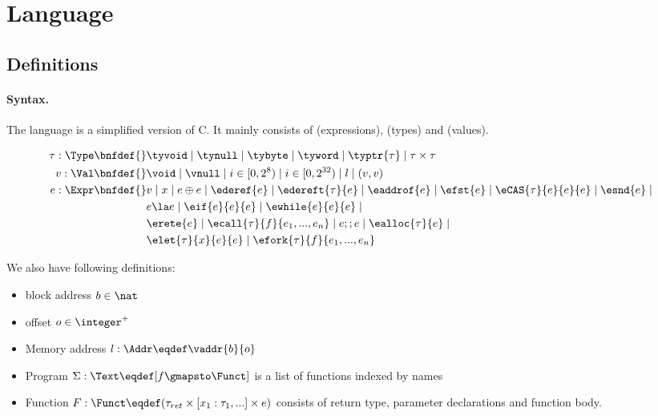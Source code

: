 \section{Language}
\label{sec:language}

\subsection{Definitions}

\paragraph{Syntax.}\label{p:type}

The language is a simplified version of C. It mainly consists of
\Expr{} (expressions), \Type{} (types) and \Val{} (values).

\begin{align*}
    \tau : \Type \bnfdef{}&
        \tyvoid \mid
        \tynull \mid
        \tybyte \mid
        \tyword \mid
        \typtr{\tau} \mid
        \tau \times \tau
\\
    v : \Val \bnfdef{}&
        \void \mid
        \vnull \mid
        i \in [0, 2^8) \mid
        i \in [0, 2^{32}) \mid
        l \mid
        (v, v)
\\
    e : \Expr \bnfdef{}&
       v \mid
       x \mid
       e \oplus e \mid
       \ederef{e} \mid
       \edereft{\tau}{e} \mid
       \eaddrof{e} \mid
       \efst{e} \mid
       \eCAS{\tau}{e}{e}{e} \mid
       \esnd{e} \mid
       \\&
       e \la e \mid
       \eif{e}{e}{e} \mid
       \ewhile{e}{e}{e} \mid
       \\&
       \erete{e} \mid
       \ecall{\tau}{f}{e_1, ..., e_n} \mid
       e ;; e \mid
       \ealloc{\tau}{e} \mid
       \\&
       \elet{\tau}{x}{e}{e} \mid
       \efork{\tau}{f}{e_1, ..., e_n}
\\
\end{align*}

We also have following definitions:

\begin{itemize}
  \item block address $b \in \nat$
  \item offset $o \in \integer^{+}$
  \item Memory address $l: \Addr \eqdef \vaddr{b}{o}$
  \item Program $\Sigma: \Text \eqdef [f \gmapsto \Funct]$ is a list of functions indexed by names
  \item Function $F: \Funct \eqdef (\tau_{ret} \times [x_1 : \tau_1, ...] \times e)$ consists of return type,
    parameter declarations and function body.
\end{itemize}

